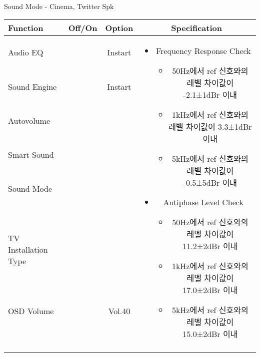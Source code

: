 \begin{frame}[t]{Sound Mode - Cinema, Twitter Spk}
\begin{tiny}
\begin{tabular}{@{}lccc@{}}
\toprule
Function & Off/On & Option & Specification \\
\midrule
Audio EQ & \color{black}{Off} & Instart &
\multirow{10}{60mm}{
\begin{itemize}
\item Frequency Response Check
	\begin{itemize}
	\item 50Hz에서 ref 신호와의 레벨 차이값이 -2.1±1dBr 이내
	\item 1kHz에서 ref 신호와의 레벨 차이값이 3.3±1dBr 이내	
	\item 5kHz에서 ref 신호와의 레벨 차이값이 -0.5±5dBr 이내
	\end{itemize}
\item Antiphase Level Check
	\begin{itemize}
	\item 50Hz에서 ref 신호와의 레벨 차이값이 11.2±2dBr 이내
	\item 1kHz에서 ref 신호와의 레벨 차이값이 17.0±2dBr 이내
	\item 5kHz에서 ref 신호와의 레벨 차이값이 15.0±2dBr 이내
	\end{itemize}
\end{itemize}
} \\
Sound Engine & \color{blue}{On} & Instart & \\
Autovolume & \color{black}{Off} & & \\
Smart Sound & \color{black}{Off} & & \\
Sound Mode & \color{blue}{On} & \color{blue}{Cinema} & \\
TV Installation Type & \color{blue}{On} & \color{black}{Standtype1} & \\
OSD Volume & \color{blue}{On} & Vol.40 & \\
& & & \\
& & & \\
& & & \\
& & & \\
\midrule
\end{tabular}
\end{tiny}


\end{frame}